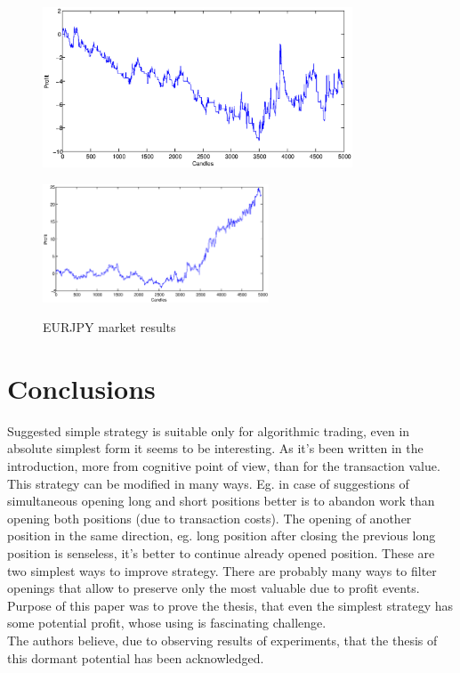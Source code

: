 \documentclass{tewiart}
\begin{document}
\begin{figure}[h]
\begin{minipage}{.49\linewidth}
\centering 
\includegraphics[width=0.82\textwidth]{images/S1d_eurjpy.eps}
\label{mansard}
\end{minipage}
\begin{minipage}{\linewidth}
\centering 
\includegraphics[width=0.6\textwidth]{images/S1s_eurjpy.eps}
\label{mansard}
\end{minipage}
\caption{EURJPY market results}
\end{figure}
\FloatBarrier

\section{Conclusions}
\indent Suggested simple strategy is suitable only for algorithmic trading, even in absolute simplest form it seems to be interesting. As it’s been written in the introduction, more from cognitive point of view, than for the transaction value.\\
\indent This strategy can be modified in many ways.  Eg. in case of suggestions of simultaneous opening long and short positions better is to abandon work than opening both positions (due to transaction costs). The opening of another position in the same direction, eg. long position after closing the previous long position is senseless, it’s better to continue already opened position. These are two simplest ways to improve strategy. There are probably many ways to filter openings that allow to preserve only the most valuable due to profit events. Purpose of this paper was to prove the thesis, that even the simplest strategy has some potential profit, whose using is fascinating challenge.\\
\indent The authors believe, due to observing results of experiments, that the thesis of this dormant potential has been acknowledged. 






\end{document}
